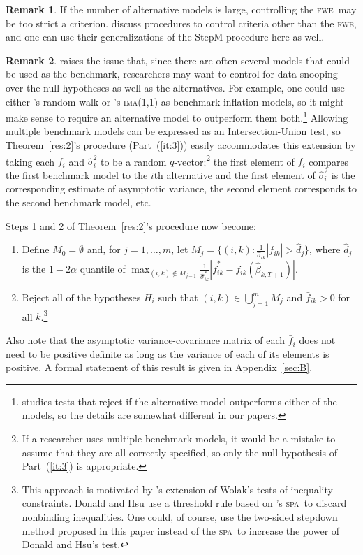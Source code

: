\documentclass[12pt,fleqn]{article}
\newcommand\citepos[2][]{\citeauthor{#2}'s \citeyearpar[#1]{#2}}
\theoremstyle{definition}
\newtheorem{rem}{Remark}
\newcommand{\fwe}{\textsc{fwe}}
\newcommand{\spa}{\textsc{spa}}
\begin{document}
\begin{rem}
  If the number of alternative models is large, controlling the \fwe\
  may be too strict a criterion.  \citet{RSW:08} discuss procedures to
  control criteria other than the \fwe, and one can use their
  generalizations of the StepM procedure here as well.
\end{rem}

\begin{rem}\label{rem:01}
  \citet{Pin:11} raises the issue that, since there are often several
  models that could be used as the benchmark, researchers may want to
  control for data snooping over the null hypotheses as well as the
  alternatives.  For example, one could use either \citepos{AtO:01}
  random walk or \citepos{StW:07} \textsc{ima}(1,1) as benchmark
  inflation models, so it might make sense to require an alternative
  model to outperform them both.\footnote{\citet{Pin:11} studies tests
    that reject if the alternative model outperforms either of the
    models, so the details are somewhat different in our papers.}
  Allowing multiple benchmark models can be expressed as an
  Intersection-Union test, so Theorem~\ref{res:2}'s procedure
  (Part~(\ref{it:3})) easily accommodates this extension by taking
  each $\bar f_i$ and $\hat{\sigma}_{i}^{2}$ to be a random
  $q$-vector;\footnote{If a researcher uses multiple benchmark models,
    it would be a mistake to assume that they are all correctly
    specified, so only the null hypothesis of Part~(\ref{it:3}) is
    appropriate.} the first element of $\bar f_{i}$ compares the first
  benchmark model to the $i$th alternative and the first element of
  $\hat{\sigma}_i^2$ is the corresponding estimate of asymptotic
  variance, the second element corresponds to the second benchmark
  model, etc.

  Steps 1 and 2 of Theorem~\ref{res:2}'s procedure now become:
  \begin{enumerate}
  \item Define $M_0 = \emptyset$ and, for $j = 1,\dots,m$, let $M_j =
    \{(i,k): \tfrac1{\hat\sigma_{ik}} |\bar{f}_{ik}| > \hat{d}_j\}$,
    where $\hat{d}_j$ is the $1-2 \alpha$ quantile of $\max_{(i,k)
      \notin M_{j-1}} \tfrac1{\hat\sigma_{ik}^*} |\bar{f}_{ik}^{*} -
    \bar{f}_{ik}(\hat{\beta}_{k,T+1})|$.
  \item Reject all of the hypotheses $H_i$ such that $(i,k) \in
    \bigcup_{j=1}^m M_j$ and $\bar{f}_{ik} > 0$ for all
    $k$.\footnote{This approach is motivated by \citepos{DoH:11}
      extension of Wolak's \citeyearpar{Wol:89b,Wol:91} tests of
      inequality constraints.  Donald and Hsu use a threshold rule
      based on \citepos{Han:05} \spa\ to discard nonbinding
      inequalities.  One could, of course, use the two-sided stepdown
      method proposed in this paper instead of the \spa\ to increase
      the power of Donald and Hsu's test.}
  \end{enumerate}
  Also note that the asymptotic variance-covariance matrix of each
  $\bar f_i$ does not need to be positive definite as long as the
  variance of each of its elements is positive.  A formal statement of
  this result is given in Appendix~\ref{sec:B}.
\end{rem}
\end{document}

